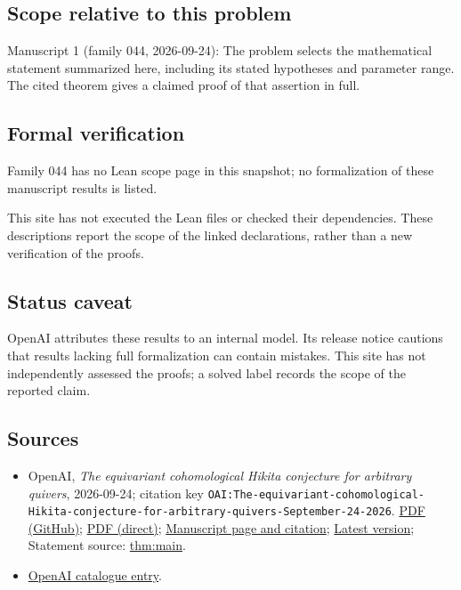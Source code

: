 \documentclass[11pt]{article}
\begin{document}
\subsection{Scope relative to this problem}
Manuscript 1 (family 044, 2026-09-24): The problem selects the mathematical statement summarized here, including its stated hypotheses and parameter range. The cited theorem gives a claimed proof of that assertion in full.

\subsection{Formal verification}
Family 044 has no Lean scope page in this snapshot; no formalization of these manuscript results is listed.

This site has not executed the Lean files or checked their dependencies. These descriptions report the scope of the linked declarations, rather than a new verification of the proofs.

\subsection{Status caveat}
OpenAI attributes these results to an internal model. Its release notice cautions that results lacking full formalization can contain mistakes. This site has not independently assessed the proofs; a solved label records the scope of the reported claim.

\subsection{Sources}
\begin{itemize}
\item OpenAI, \emph{The equivariant cohomological Hikita conjecture for arbitrary quivers}, 2026-09-24; citation key \texttt{OAI:The-equivariant-cohomological-Hikita-conjecture-for-arbitrary-quivers-September-24-2026}. \href{https://github.com/openai/math/blob/adc7f1241b42e322a6451854ab7e4b4c146bf78a/preprints/The-equivariant-cohomological-Hikita-conjecture-for-arbitrary-quivers-September-24-2026/main.pdf}{PDF (GitHub)}; \href{https://github.com/openai/math/raw/adc7f1241b42e322a6451854ab7e4b4c146bf78a/preprints/The-equivariant-cohomological-Hikita-conjecture-for-arbitrary-quivers-September-24-2026/main.pdf}{PDF (direct)}; \href{https://github.com/openai/math/blob/adc7f1241b42e322a6451854ab7e4b4c146bf78a/preprints/The-equivariant-cohomological-Hikita-conjecture-for-arbitrary-quivers-September-24-2026/README.md}{Manuscript page and citation}; \href{https://github.com/openai/math/blob/main/preprints/The-equivariant-cohomological-Hikita-conjecture-for-arbitrary-quivers-September-24-2026/main.pdf}{Latest version}; Statement source: \href{https://github.com/openai/math/blob/adc7f1241b42e322a6451854ab7e4b4c146bf78a/preprints/The-equivariant-cohomological-Hikita-conjecture-for-arbitrary-quivers-September-24-2026/build/sections/introduction.tex\#L78}{thm:main}.
\item \href{https://github.com/openai/math/blob/adc7f1241b42e322a6451854ab7e4b4c146bf78a/CONTENTS.md}{OpenAI catalogue entry}.
\end{itemize}
\end{document}
